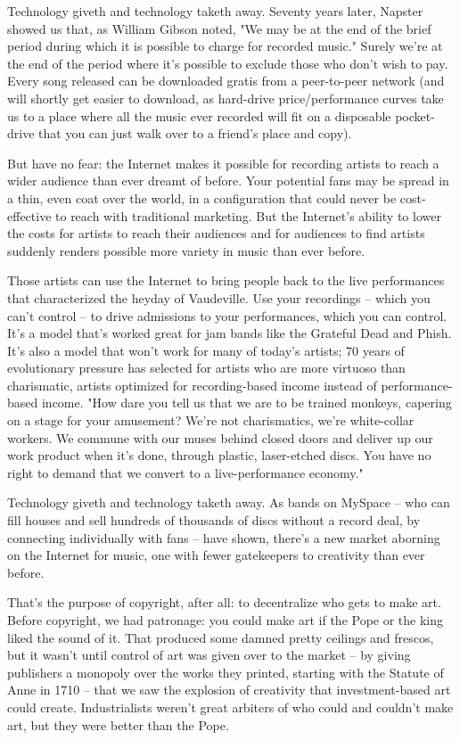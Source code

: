 Technology giveth and technology taketh away. Seventy years later,
Napster showed us that, as William Gibson noted, "We may be at the
end of the brief period during which it is possible to charge for
recorded music." Surely we're at the end of the period where it's
possible to exclude those who don't wish to pay. Every song
released can be downloaded gratis from a peer-to-peer network (and
will shortly get easier to download, as hard-drive
price/performance curves take us to a place where all the music
ever recorded will fit on a disposable pocket-drive that you can
just walk over to a friend's place and copy).

But have no fear: the Internet makes it possible for recording
artists to reach a wider audience than ever dreamt of before. Your
potential fans may be spread in a thin, even coat over the world,
in a configuration that could never be cost-effective to reach with
traditional marketing. But the Internet's ability to lower the
costs for artists to reach their audiences and for audiences to
find artists suddenly renders possible more variety in music than
ever before.

Those artists can use the Internet to bring people back to the live
performances that characterized the heyday of Vaudeville. Use your
recordings -- which you can't control -- to drive admissions to
your performances, which you can control. It's a model that's
worked great for jam bands like the Grateful Dead and Phish. It's
also a model that won't work for many of today's artists; 70 years
of evolutionary pressure has selected for artists who are more
virtuoso than charismatic, artists optimized for recording-based
income instead of performance-based income. "How dare you tell us
that we are to be trained monkeys, capering on a stage for your
amusement? We're not charismatics, we're white-collar workers. We
commune with our muses behind closed doors and deliver up our work
product when it's done, through plastic, laser-etched discs. You
have no right to demand that we convert to a live-performance
economy."

Technology giveth and technology taketh away. As bands on MySpace
-- who can fill houses and sell hundreds of thousands of discs
without a record deal, by connecting individually with fans -- have
shown, there's a new market aborning on the Internet for music, one
with fewer gatekeepers to creativity than ever before.

That's the purpose of copyright, after all: to decentralize who
gets to make art. Before copyright, we had patronage: you could
make art if the Pope or the king liked the sound of it. That
produced some damned pretty ceilings and frescos, but it wasn't
until control of art was given over to the market -- by giving
publishers a monopoly over the works they printed, starting with
the Statute of Anne in 1710 -- that we saw the explosion of
creativity that investment-based art could create. Industrialists
weren't great arbiters of who could and couldn't make art, but they
were better than the Pope.

